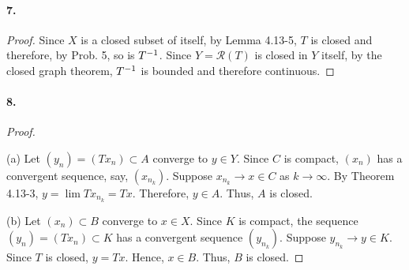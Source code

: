   \paragraph{7.}
  \begin{proof}
    Since $X$ is a closed subset of itself, by Lemma 4.13-5, $T$ is closed and
    therefore, by Prob. 5, so is $T^{-1}$. Since $Y=\mathcal{R}(T)$ is closed in
    $Y$ itself, by the closed graph theorem, $T^{-1}$ is bounded and therefore 
    continuous.
  \end{proof}
  
  \paragraph{8.}
  \begin{proof}
    $\,$\par
    (a) Let $(y_n)=(Tx_n)\subset A$ converge to $y\in Y$. Since $C$ is compact,
    $(x_n)$ has a convergent sequence, say, $(x_{n_k})$. Suppose $x_{n_k}\to x
    \in C$ as $k\to\infty$. By Theorem 4.13-3, $y=\lim Tx_{n_k}=Tx$. Therefore,
    $y\in A$. Thus, $A$ is closed.\par
    (b) Let $(x_n)\subset B$ converge to $x\in X$. Since $K$ is compact, the
    sequence $(y_n)=(Tx_n)\subset K$ has a convergent sequence $(y_{n_k})$. 
    Suppose $y_{n_k}\to y\in K$. Since $T$ is closed, $y=Tx$. Hence, $x\in B$.
    Thus, $B$ is closed.
  \end{proof}
















